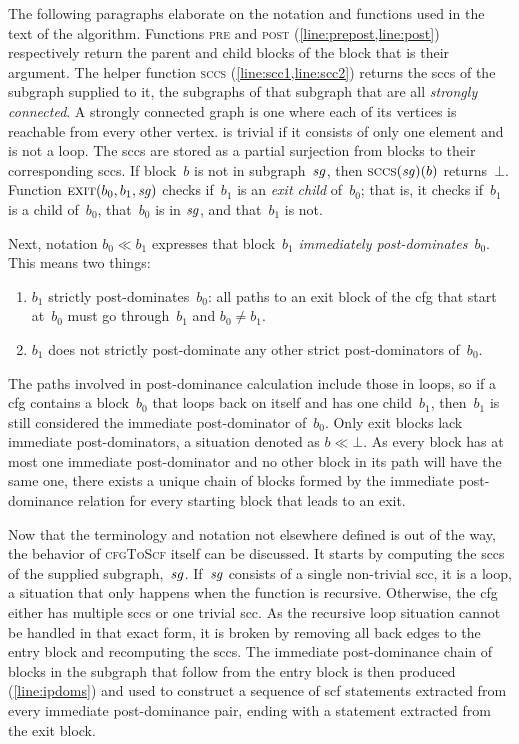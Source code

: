 The following paragraphs elaborate on the notation and functions
used in the text of the algorithm.
Functions \textsc{pre} and \textsc{post} (\cref{line:prepost,line:post})
respectively return the parent and child blocks of the block that is their argument.
The helper function \textsc{sccs} (\cref{line:scc1,line:scc2})
returns the \acp{scc} of the subgraph supplied to it,
the subgraphs of that subgraph that are all \emph{strongly connected}.%
A strongly connected graph is one
where each of its vertices is reachable from every other vertex.
 is trivial if it consists of only one element and is not a loop.
The \acp{scc} are stored as a partial surjection%
from blocks to their corresponding \acp{scc}.
If block~$b$ is not in subgraph~$\mathit{sg}$,
then $\textsc{sccs}(\mathit{sg})(b)$ returns~$\bot$.
Function $\textsc{exit}(b_0,b_1,\mathit{sg})$ checks if~$b_1$ is an \emph{exit child}%
of~$b_0$; that is, it checks if~$b_1$ is a child of~$b_0$,
that~$b_0$ is in $\mathit{sg}$, and that~$b_1$ is not.

Next, notation $b_0\ll b_1$ expresses that block~$b_1$
\emph{immediately post-dominates}~$b_0$.%
This means two things:
\begin{enumerate}
  \item $b_1$ strictly post-dominates~$b_0$:
  all paths to an exit block of the \ac{cfg} that start at~$b_0$
  must go through~$b_1$ and $b_0\neq b_1$.
  \item $b_1$ does not strictly post-dominate
  any other strict post-dominators of~$b_0$.
\end{enumerate}
The paths involved in post-dominance calculation include those in loops,
so if a \ac{cfg} contains a block~$b_0$
that loops back on itself and has one child~$b_1$,
then~$b_1$ is still considered the immediate post-dominator of~$b_0$.%
Only exit blocks lack immediate post-dominators, a situation denoted as $b\ll\bot$.
As every block has at most one immediate post-dominator
and no other block in its path will have the same one,
there exists a unique chain of blocks formed by the immediate post-dominance relation
for every starting block that leads to an exit.

Now that the terminology and notation not elsewhere defined is out of the way,
the behavior of \textsc{cfgToScf} itself can be discussed.
It starts by computing the \acp{scc} of the supplied subgraph,~$\mathit{sg}$.
If~$\mathit{sg}$ consists of a single non-trivial \ac{scc}, it is a loop,%
a situation that only happens when the function is recursive.%
Otherwise, the \ac{cfg} either has multiple \acp{scc} or one trivial \ac{scc}.
As the recursive loop situation cannot be handled in that exact form,
it is broken by removing all back edges to the entry block
and recomputing the \acp{scc}.
The immediate post-dominance chain of blocks in the subgraph
that follow from the entry block is then produced (\cref{line:ipdoms})
and used to construct a sequence of \acl{scf} statements
extracted from every immediate post-dominance pair,
ending with a statement extracted from the exit block.

